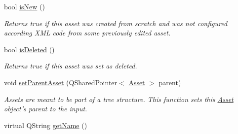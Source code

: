 \begin{DoxyCompactItemize}
bool \hyperlink{class_picto_1_1_asset_acfc9be521ca981e8b839b1dae57e5d55}{is\-New} ()
\begin{DoxyCompactList}\small\item\em Returns true if this asset was created from scratch and was not configured according X\-M\-L code from some previously edited asset. \end{DoxyCompactList}\item 
bool \hyperlink{class_picto_1_1_asset_af4c73b724fc6b6b6313228d2bdec092e}{is\-Deleted} ()
\begin{DoxyCompactList}\small\item\em Returns true if this asset was set as deleted. \end{DoxyCompactList}\item 
void \hyperlink{class_picto_1_1_asset_a2b073c1153a417abdc3a467446015ed1}{set\-Parent\-Asset} (Q\-Shared\-Pointer$<$ \hyperlink{class_picto_1_1_asset}{Asset} $>$ parent)
\begin{DoxyCompactList}\small\item\em Assets are meant to be part of a tree structure. This function sets this \hyperlink{class_picto_1_1_asset}{Asset} object's parent to the input. \end{DoxyCompactList}\item 
\hypertarget{class_picto_1_1_asset_a1757f208680523df1aedeec039fdd62e}{virtual Q\-String \hyperlink{class_picto_1_1_asset_a1757f208680523df1aedeec039fdd62e}{get\-Name} ()}\label{class_picto_1_1_asset_a1757f208680523df1aedeec039fdd62e}


\end{DoxyCompactItemize}
